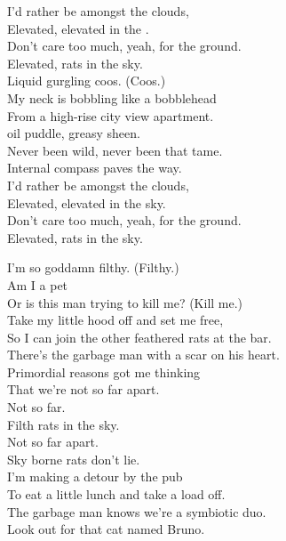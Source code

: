 


I'd rather be amongst the clouds, \\
Elevated, elevated in the . \\
Don't care too much, yeah, for the ground. \\
Elevated, rats in the sky. \\

Liquid gurgling coos. (Coos.) \\
My neck is bobbling like a bobblehead \\
From a high-rise city view apartment. \\
 oil puddle, greasy sheen. \\
Never been wild, never been that tame. \\
Internal compass paves the way. \\

I'd rather be amongst the clouds, \\
Elevated, elevated in the sky. \\
Don't care too much, yeah, for the ground. \\
Elevated, rats in the sky. \\


I'm so goddamn filthy. (Filthy.) \\
Am I a pet \\
Or is this man trying to kill me? (Kill me.) \\

Take my little hood off and set me free, \\
So I can join the other feathered rats at the bar. \\
There's the garbage man with a scar on his heart. \\
Primordial reasons got me thinking \\
That we're not so far apart. \\

Not so far. \\
Filth rats in the sky. \\
Not so far apart. \\
Sky borne rats don't lie. \\

I'm making a detour by the pub \\
To eat a little lunch and take a load off. \\
The garbage man knows we're a symbiotic duo. \\
Look out for that cat named Bruno. \\

